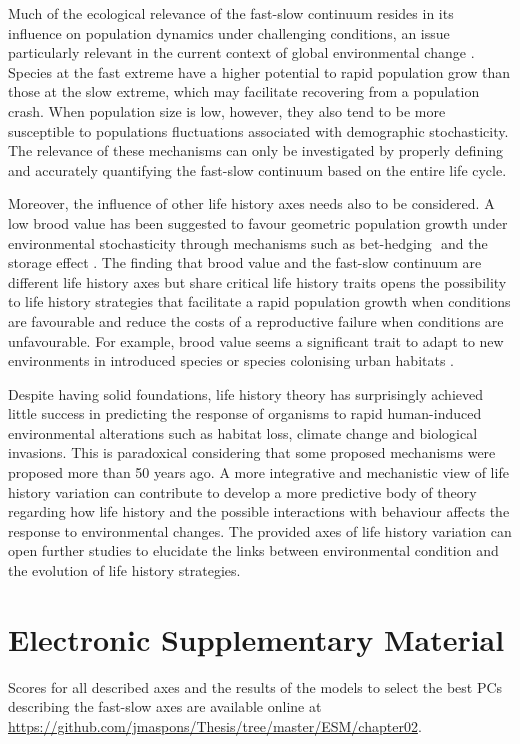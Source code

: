 Much of the ecological relevance of the fast-slow continuum resides in its 
influence on population dynamics under challenging conditions, an issue 
particularly relevant in the current context of global environmental change
\citep{Ricklefs2002,Forcada2008,Reale2010a,Sol2018,Maspons2019}.
Species at the fast extreme have a higher potential to rapid population grow 
than those at the slow extreme, which may facilitate recovering from a 
population crash. When population size is low, however, they also tend to be 
more susceptible to populations fluctuations associated with demographic 
stochasticity. The relevance of these mechanisms can only be investigated by 
properly defining and accurately quantifying the fast-slow continuum based on 
the entire life cycle. 

Moreover, the influence of other life history axes needs also to be considered. 
A low brood value has been suggested to favour geometric population growth under 
environmental stochasticity through mechanisms such as bet-hedging 
\citep{Stearns2000a}⁠ and the storage effect \citep{Cubaynes2011}. The finding
that brood value and the fast-slow continuum are different life history axes but
share critical life history traits opens the possibility to life history
strategies that facilitate a rapid population growth when conditions are
favourable and reduce the costs of a reproductive failure when conditions are
unfavourable. For example, brood value seems a significant trait to adapt to
new environments in introduced species or species colonising urban habitats
\citep{Sol2012a,Sol2014}.

Despite having solid foundations, life history theory has surprisingly achieved 
little success in predicting the response of organisms to rapid human-induced 
environmental alterations such as habitat loss, climate change and biological 
invasions. This is paradoxical considering that some proposed mechanisms were 
proposed more than 50 years ago. A more integrative and mechanistic view of life 
history variation can contribute to develop a more predictive body of theory 
regarding how life history and the possible interactions with behaviour
\citep{Ricklefs2002,Reale2010a,Sol2018,Maspons2019} affects the response to
environmental changes. The provided axes of life history variation can open
further studies to elucidate the links between environmental condition and the
evolution of life history strategies.


\section*{Electronic Supplementary Material}

Scores for all described axes and the results of the models to select the best
PCs describing the fast-slow axes are available online at
\url{https://github.com/jmaspons/Thesis/tree/master/ESM/chapter02}.
